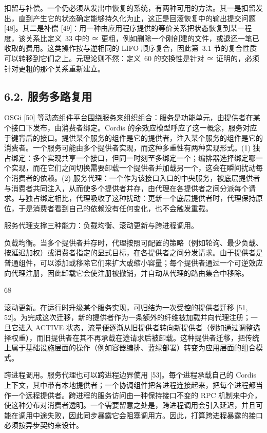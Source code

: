 扣留与补偿。一个仍必须从发出中恢复的系统，有两种可用的方法。其一是扣留发出，直到产生它的状态确定能够持久化为止，这正是回滚恢复中的输出提交问题 {[}48{]}。其二是补偿 {[}49{]}：用一种由应用程序提供的等价关系把状态恢复到某一程度，该关系比定义~33 中的 ≃ 更粗，例如删除一个刚创建的文件，或退还一笔已收取的费用。这类操作按与逆相同的 LIFO 顺序复合，因此第~3.1 节的复合性质可以转移到它们之上。元理论则不然：定义~60 的交换性是针对 ≃ 证明的，必须针对更粗的那个关系重新建立。

\subsection{6.2. 服务多路复用}\label{service-multiplexing}

OSGi {[}50{]} 等动态组件平台围绕服务来组织组合：服务是功能单元，由提供者在某个接口下发布，由消费者绑定。Cordis 的余效应模型呼应了这一概念，服务对应于键背后的接口。提供某个服务的组件是它的提供者，注入某个服务的组件是它的消费者。一个服务可能由多个提供者实现，而这种多重性有两种实现形式。(1) 独占绑定：多个实现共享一个接口，但同一时刻至多绑定一个；编排器选择绑定哪一个实现，而在它们之间切换需要卸载一个提供者并加载另一个，这会在瞬间扰动每个消费者的依赖。(2) 服务代理：一个作为该接口入口的中央服务，被底层提供者与消费者共同注入，从而使多个提供者并存，由代理在各提供者之间分派每个请求。与独占绑定相比，代理吸收了这种扰动：更新一个底层提供者时，代理保持原位，于是消费者看到自己的依赖没有任何变化，也不会触发重载。

服务代理支撑三种能力：负载均衡、滚动更新与跨进程调用。

负载均衡。当多个提供者并存时，代理按照可配置的策略（例如轮询、最少负载、按延迟加权）或消费者指定的显式目标，在各提供者之间分发请求。由于提供者是普通组件，可以添加或移除它们来扩大或缩小容量；每个提供者通过一个可逆效应向代理注册，因此卸载它会使注册被撤销，并自动从代理的路由集合中移除。

68

滚动更新。在运行时升级某个服务实现，可归结为一次受控的提供者迁移 {[}51, 52{]}。为完成这次迁移，新的提供者作为一条额外的纤维被加载并向代理注册；一旦它进入 ACTIVE 状态，流量便逐渐从旧提供者转向新提供者（例如通过调整选择权重），而旧提供者在其不再承载在途请求后被卸载。这种提供者迁移，把传统上属于基础设施层面的操作（例如容器编排、蓝绿部署）转变为应用层面的组合模式。

跨进程调用。服务代理也可以跨进程边界使用 {[}53{]}。每个进程承载自己的 Cordis 上下文，其中带有本地提供者；一个协调组件把各进程连接起来，把每个进程都当作一个远程提供者。跨进程的服务访问由一种保持接口不变的 RPC 机制来中介，使这种分布对消费者透明。一个需要留意之处是，跨进程调用会引入延迟，并且可能在调用中途失败，因此同步暴露它会阻塞调用方。因此，打算跨进程暴露的接口必须按异步契约来设计。

